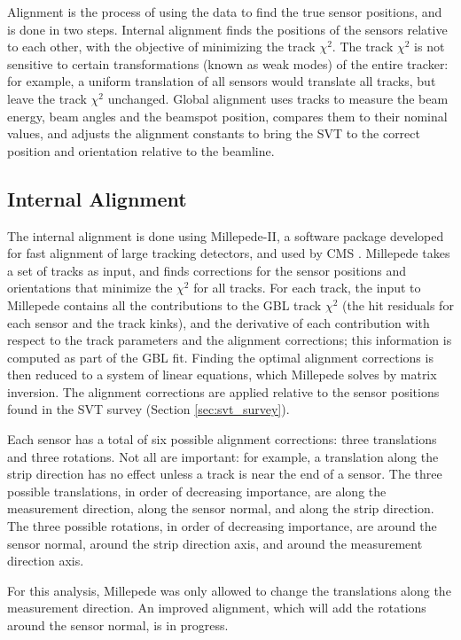 Alignment is the process of using the data to find the true sensor positions, and is done in two steps.
Internal alignment finds the positions of the sensors relative to each other, with the objective of minimizing the track $\chi^2$.
The track $\chi^2$ is not sensitive to certain transformations (known as weak modes) of the entire tracker: for example, a uniform translation of all sensors would translate all tracks, but leave the track $\chi^2$ unchanged.
Global alignment uses tracks to measure the beam energy, beam angles and the beamspot position, compares them to their nominal values, and adjusts the alignment constants to bring the SVT to the correct position and orientation relative to the beamline.

\subsection{Internal Alignment}
\label{sec:internal_alignment}
The internal alignment is done using Millepede-II, a software package developed for fast alignment of large tracking detectors, and used by CMS \cite{blobel_software_2006, blobel_fast_2011}.
Millepede takes a set of tracks as input, and finds corrections for the sensor positions and orientations that minimize the $\chi^2$ for all tracks.
For each track, the input to Millepede contains all the contributions to the GBL track $\chi^2$ (the hit residuals for each sensor and the track kinks), and the derivative of each contribution with respect to the track parameters and the alignment corrections; this information is computed as part of the GBL fit.
Finding the optimal alignment corrections is then reduced to a system of linear equations, which Millepede solves by matrix inversion.
The alignment corrections are applied relative to the sensor positions found in the SVT survey (Section \ref{sec:svt_survey}).

Each sensor has a total of six possible alignment corrections: three translations and three rotations.
Not all are important: for example, a translation along the strip direction has no effect unless a track is near the end of a sensor.
The three possible translations, in order of decreasing importance, are along the measurement direction, along the sensor normal, and along the strip direction.
The three possible rotations, in order of decreasing importance, are around the sensor normal, around the strip direction axis, and around the measurement direction axis.

For this analysis, Millepede was only allowed to change the translations along the measurement direction.
An improved alignment, which will add the rotations around the sensor normal, is in progress.

